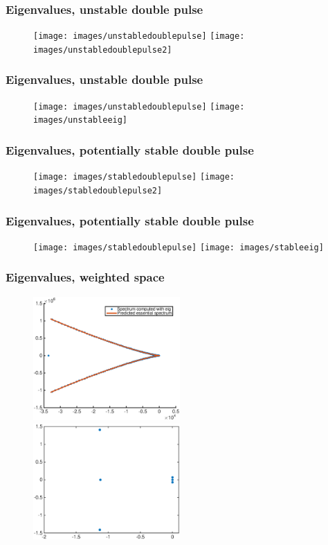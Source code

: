 \documentclass[16pt]{beamer}
\begin{document}
\begin{frame}
	\frametitle{Eigenvalues, unstable double pulse}
	\fontsize{16}{7.2}\selectfont
	\begin{figure}
   		\texttt{[image: images/unstabledoublepulse]}
   		\hfill
   		\texttt{[image: images/unstabledoublepulse2]}
	\end{figure}
\end{frame}

\begin{frame}
	\frametitle{Eigenvalues, unstable double pulse}
	\fontsize{16}{7.2}\selectfont
	\begin{figure}
   		\texttt{[image: images/unstabledoublepulse]}
   		\hfill
   		\texttt{[image: images/unstableeig]}
	\end{figure}
\end{frame}

\begin{frame}
	\frametitle{Eigenvalues, potentially stable double pulse}
	\fontsize{16}{7.2}\selectfont
	\begin{figure}
   		\texttt{[image: images/stabledoublepulse]}
   		\hfill
   		\texttt{[image: images/stabledoublepulse2]}
	\end{figure}
\end{frame}

\begin{frame}
	\frametitle{Eigenvalues, potentially stable double pulse}
	\fontsize{16}{7.2}\selectfont
	\begin{figure}
   		\texttt{[image: images/stabledoublepulse]}
   		\hfill
   		\texttt{[image: images/stableeig]}
	\end{figure}
\end{frame}

\begin{frame}
	\frametitle{Eigenvalues, weighted space}
	\fontsize{16}{7.2}\selectfont
	\begin{figure}
   		\includegraphics[width=0.5\textwidth]{images/stableeigweighted1}
   		\hfill
   		\includegraphics[width=0.5\textwidth]{images/stableeigweighted2}
	\end{figure}
\end{frame}
\end{document}
